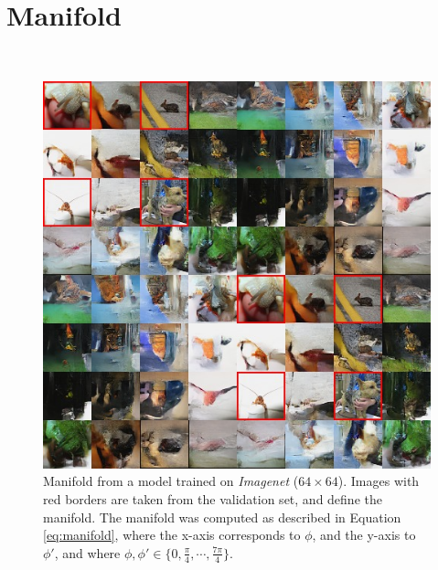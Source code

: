 \documentclass{article}
\begin{document}
\newpage

\section{Manifold}
~ \\

\begin{figure}[H]
    \centering \includegraphics[width=1.\textwidth]{imnet_manifold_highlight.jpg}
    \caption{Manifold from a model trained on \emph{Imagenet} ($64 \times 64$). Images with red borders are taken from the validation set, and define the manifold. The manifold was computed as described in Equation \ref{eq:manifold}, where the x-axis corresponds to $\phi$, and the y-axis to $\phi'$, and where $\phi, \phi' \in \{0, \frac{\pi}{4}, \cdots, \frac{7\pi}{4}\}$.
    }
\vspace{80pt}
\end{figure}
\end{document}
